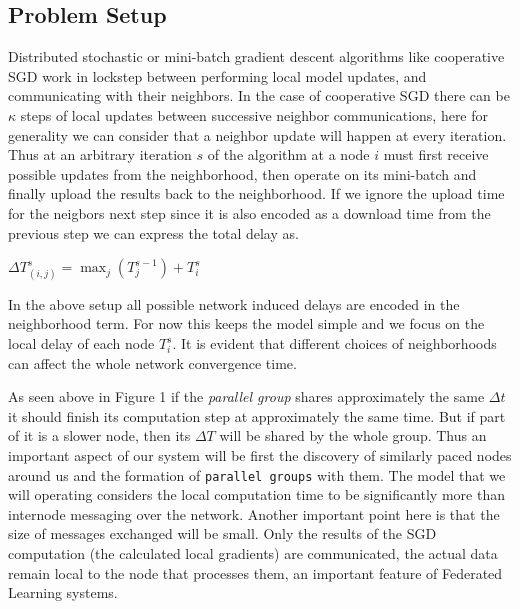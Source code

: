 \documentclass[12pt,notitlepage]{article}
\newcommand{\bmc}{\begin{center} \begin{math}}
\newcommand{\emc}{\end{math} \end{center}}
\begin{document}
\subsection{Problem Setup}
Distributed stochastic or mini-batch gradient descent algorithms like 
cooperative SGD \cite{coop-sgd} work in lockstep between performing local 
model updates, and communicating with their neighbors. In the case of 
cooperative SGD there can be $\kappa$ steps of local updates between successive
neighbor communications, here for generality we can consider that a neighbor
update will happen at every iteration. Thus at an arbitrary iteration $s$ of
the algorithm at a node $i$ must first receive possible updates from the 
neighborhood, then operate on its mini-batch and finally upload the results
back to the neighborhood. If we ignore the upload time for the neigbors next 
step since it is also encoded as a download time from the previous step we can
express the total delay as.
\bmc
\Delta T^s_{(i,j)} = \max_j(T_{j}^{s-1}) + T^s_i 
\emc

In the above setup all possible network induced delays are encoded in the 
neighborhood term. For now this keeps the model simple and we focus on the 
local delay of each node $T^s_i$. It is evident that different choices of
neighborhoods can affect the whole network convergence time.                                                                                                                                                                  

As seen above in Figure 1 if the {\it parallel group} shares approximately the
same $\Delta t$ it should finish its computation step at approximately the 
same time. But if part of it is a slower node, then its $\Delta T$ will be
shared by the whole group. Thus an important aspect of our system  will be
first the discovery of similarly paced nodes around us and the formation of
{\tt parallel groups} with them. 
The model that we will operating considers the local computation time to be
significantly more than internode messaging over the network. Another important
point here is that the size of messages exchanged will be small. Only the
results of the SGD computation (the calculated local gradients) are communicated,
the actual data remain local to the node that processes them, an important feature
of Federated Learning systems.
\end{document}
